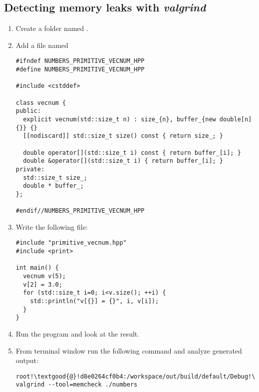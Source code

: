 \subsection{Detecting memory leaks with \emph{valgrind}}

\begin{enumerate}

\item
Create a folder named .

\item 
Add a file named

\begin{lstlisting}
#ifndef NUMBERS_PRIMITIVE_VECNUM_HPP
#define NUMBERS_PRIMITIVE_VECNUM_HPP

#include <cstddef>

class vecnum {
public:
  explicit vecnum(std::size_t n) : size_{n}, buffer_{new double[n]{}} {}
  [[nodiscard]] std::size_t size() const { return size_; }

  double operator[](std::size_t i) const { return buffer_[i]; }
  double &operator[](std::size_t i) { return buffer_[i]; }
private:
  std::size_t size_;
  double * buffer_;
};

#endif//NUMBERS_PRIMITIVE_VECNUM_HPP
\end{lstlisting}

\item
Write the following 
 file:

\begin{lstlisting}
#include "primitive_vecnum.hpp"
#include <print>

int main() {
  vecnum v(5);
  v[2] = 3.0;
  for (std::size_t i=0; i<v.size(); ++i) {
    std::println("v[{}] = {}", i, v[i]);
  }
}
\end{lstlisting}

\item
Run the program and look at the result.

\item
From terminal window run the following command and analyze generated output:

\begin{lstlisting}[style=terminal,escapechar=!]
root!\textgood{@}!d8e0264cf0b4:/workspace/out/build/default/Debug!\textgood{\#}! valgrind --tool=memcheck ./numbers
\end{lstlisting}

\end{enumerate}
